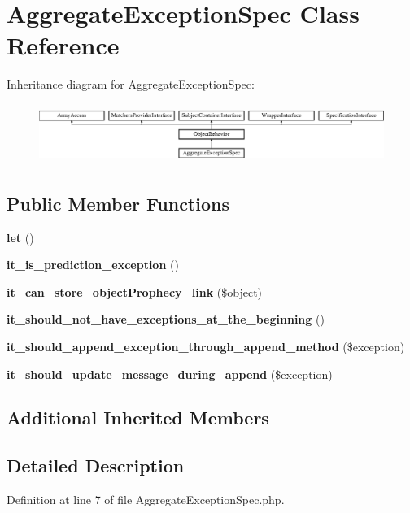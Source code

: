 \section{Aggregate\+Exception\+Spec Class Reference}
\label{classspec_1_1_prophecy_1_1_exception_1_1_prediction_1_1_aggregate_exception_spec}
Inheritance diagram for Aggregate\+Exception\+Spec\+:\begin{figure}[H]
\begin{center}
\leavevmode
\includegraphics[height=1.953488cm]{classspec_1_1_prophecy_1_1_exception_1_1_prediction_1_1_aggregate_exception_spec}
\end{center}
\end{figure}
\subsection*{Public Member Functions}
\begin{DoxyCompactItemize}
\item 
{\bf let} ()
\item 
{\bf it\+\_\+is\+\_\+prediction\+\_\+exception} ()
\item 
{\bf it\+\_\+can\+\_\+store\+\_\+object\+Prophecy\+\_\+link} (\$object)
\item 
{\bf it\+\_\+should\+\_\+not\+\_\+have\+\_\+exceptions\+\_\+at\+\_\+the\+\_\+beginning} ()
\item 
{\bf it\+\_\+should\+\_\+append\+\_\+exception\+\_\+through\+\_\+append\+\_\+method} (\$exception)
\item 
{\bf it\+\_\+should\+\_\+update\+\_\+message\+\_\+during\+\_\+append} (\$exception)
\end{DoxyCompactItemize}
\subsection*{Additional Inherited Members}


\subsection{Detailed Description}


Definition at line 7 of file Aggregate\+Exception\+Spec.\+php.



